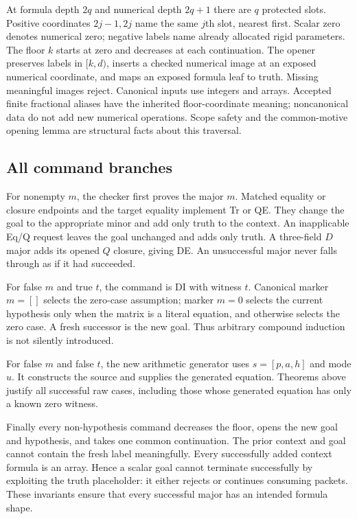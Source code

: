 \documentclass[11pt,letterpaper]{article}
\theoremstyle{definition}\newtheorem{definition}[theorem]{Definition}
\theoremstyle{remark}\newtheorem{remark}[theorem]{Remark}
\begin{document}
At formula depth $2q$ and numerical depth $2q+1$ there are $q$ protected
slots. Positive coordinates $2j-1,2j$ name the same $j$th slot, nearest
first. Scalar zero denotes numerical zero; negative labels name already
allocated rigid parameters. The floor $k$ starts at zero and decreases
at each continuation. The opener preserves labels in $[k,d)$, inserts a
checked numerical image at an exposed numerical coordinate, and maps an
exposed formula leaf to truth. Missing meaningful images reject.
Canonical inputs use integers and arrays. Accepted finite fractional
aliases have the inherited floor-coordinate meaning; noncanonical data
do not add new numerical operations. Scope safety and the common-motive
opening lemma are structural facts about this traversal.

\subsection{All command branches}

For nonempty $m$, the checker first proves the major $m$. Matched equality
or closure endpoints and the target equality implement Tr or QE. They
change the goal to the appropriate minor and add only truth to the
context. An inapplicable Eq/Q request leaves the goal unchanged and adds
only truth. A three-field $D$ major adds its opened $Q$ closure, giving
DE. An unsuccessful major never falls through as if it had succeeded.

For false $m$ and true $t$, the command is DI with witness $t$.
Canonical marker $m=[]$ selects the zero-case assumption; marker $m=0$
selects the current hypothesis only when the matrix is a literal
equation, and otherwise selects the zero case. A fresh successor is the
new goal. Thus arbitrary compound induction is not silently introduced.

For false $m$ and false $t$, the new arithmetic generator uses
$s=[p,a,h]$ and mode $u$. It constructs the source and supplies the
generated equation. Theorems above justify all successful raw cases,
including those whose generated equation has only a known zero witness.

Finally every non-hypothesis command decreases the floor, opens the new
goal and hypothesis, and takes one common continuation. The prior context
and goal cannot contain the fresh label meaningfully. Every successfully
added context formula is an array. Hence a scalar goal cannot terminate
successfully by exploiting the truth placeholder: it either rejects or
continues consuming packets. These invariants ensure that every successful
major has an intended formula shape.
\end{document}

